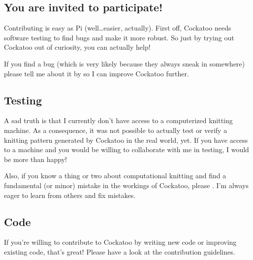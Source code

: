 \documentclass[letterpaper,10pt,english]{sphinxmanual}
\begin{document}
\subsection{You are invited to participate!}
\label{\detokenize{README:you-are-invited-to-participate}}\label{\detokenize{README:id9}}
Contributing is easy as Pi (well…easier, actually). First off,
Cockatoo needs software testing to find bugs and make it more robust. So
just by trying out Cockatoo out of curiosity, you can actually help!

If you find a bug (which is very likely because they always sneak in
somewhere) please tell me about it by  so I can improve
Cockatoo further.


\subsection{Testing}
\label{\detokenize{README:testing}}
A sad truth is that I currently don’t have access to a computerized
knitting machine. As a consequence, it was not possible to actually test
or verify a knitting pattern generated by Cockatoo in the real world,
yet. If you have access to a machine and you would be willing to
collaborate with me in testing, I would be more than happy!

Also, if you know a thing or two about computational knitting and find a
fundamental (or minor) mistake in the workings of Cockatoo, please . I’m always eager
to learn from others and fix mistakes.


\subsection{Code}
\label{\detokenize{README:code}}
If you’re willing to contribute to Cockatoo by writing new code or
improving existing code, that’s great! Please have a look at the
contribution guidelines.
\end{document}
